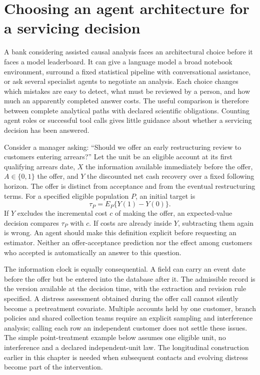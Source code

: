 \label{exec13:census-agents-end}


\section{Choosing an agent architecture for a servicing decision}
\label{exec13:agent-architecture}

A bank considering assisted causal analysis faces an architectural choice
before it faces a model leaderboard. It can give a language model a broad
notebook environment, surround a fixed statistical pipeline with conversational
assistance, or ask several specialist agents to negotiate an analysis. Each
choice changes which mistakes are easy to detect, what must be reviewed by a
person, and how much an apparently completed answer costs. The useful comparison
is therefore between complete analytical paths with declared scientific
obligations. Counting agent roles or successful tool calls gives little guidance
about whether a servicing decision has been answered.

Consider a manager asking: ``Should we offer an early restructuring review to
customers entering arrears?'' Let the unit be an eligible account at its first
qualifying arrears date, $X$ the information available immediately before the
offer, $A\in\{0,1\}$ the offer, and $Y$ the discounted net cash recovery over a
fixed following horizon. The offer is distinct from acceptance and from the
eventual restructuring terms. For a specified eligible population $P$, an
initial target is
\begin{equation}
 \tau_P=E_P\{Y(1)-Y(0)\}.
 \label{exec13:architecture-target}
\end{equation}
If $Y$ excludes the incremental cost $c$ of making the offer, an expected-value
decision compares $\tau_P$ with $c$. If costs are already inside $Y$, subtracting
them again is wrong. An agent should make this definition explicit before
requesting an estimator. Neither an offer-acceptance prediction nor the effect
among customers who accepted is automatically an answer to this question.

The information clock is equally consequential. A field can carry an event
date before the offer but be entered into the database after it. The admissible
record is the version available at the decision time, with the extraction and
revision rule specified. A distress assessment obtained during the offer call
cannot silently become a pretreatment covariate. Multiple accounts held by one
customer, branch policies and shared collection teams require an explicit
sampling and interference analysis; calling each row an independent customer
does not settle these issues. The simple point-treatment example below assumes
one eligible unit, no interference and a declared independent-unit law. The
longitudinal construction earlier in this chapter is needed when subsequent
contacts and evolving distress become part of the intervention.

